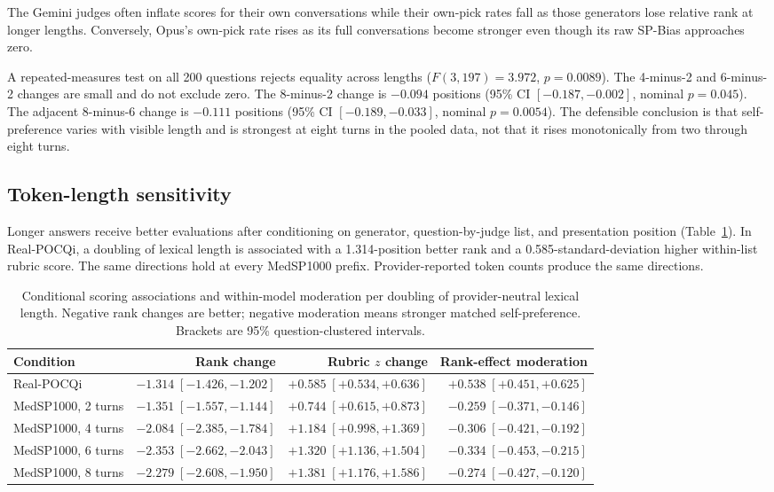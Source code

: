 \documentclass[11pt]{article}
\begin{document}
The Gemini judges often inflate scores for their own conversations while their
own-pick rates fall as those generators lose relative rank at longer lengths.
Conversely, Opus's own-pick rate rises as its full conversations become
stronger even though its raw SP-Bias approaches zero.

A repeated-measures test on all 200 questions
rejects equality across lengths ($F(3,197)=3.972$, $p=0.0089$). The 4-minus-2
and 6-minus-2 changes are small and do not exclude zero. The 8-minus-2 change is
$-0.094$ positions (95\% CI $[-0.187,-0.002]$, nominal $p=0.045$). The adjacent
8-minus-6 change is $-0.111$ positions (95\% CI $[-0.189,-0.033]$, nominal
$p=0.0054$). The
defensible conclusion is that self-preference varies with visible length and is
strongest at eight turns in the pooled data, not that it rises monotonically
from two through eight turns.

\subsection{Token-length sensitivity}

Longer answers receive better evaluations after conditioning on generator,
question-by-judge list, and presentation position (Table~\ref{tab:length}). In
Real-POCQi, a doubling of lexical length is associated with a 1.314-position
better rank and a 0.585-standard-deviation higher within-list rubric score. The
same directions hold at every MedSP1000 prefix. Provider-reported token counts
produce the same directions.

\begin{table}[htbp]
\centering
\scriptsize
\caption{Conditional scoring associations and within-model moderation per
doubling of provider-neutral lexical length. Negative rank changes are better;
negative moderation means stronger matched self-preference. Brackets are 95\%
question-clustered intervals.}
\label{tab:length}
\begin{tabular}{lrrr}
\toprule
Condition & Rank change & Rubric $z$ change & Rank-effect moderation \\
\midrule
Real-POCQi & $-1.314\;[-1.426,-1.202]$ & $+0.585\;[+0.534,+0.636]$ & $+0.538\;[+0.451,+0.625]$ \\
MedSP1000, 2 turns & $-1.351\;[-1.557,-1.144]$ & $+0.744\;[+0.615,+0.873]$ & $-0.259\;[-0.371,-0.146]$ \\
MedSP1000, 4 turns & $-2.084\;[-2.385,-1.784]$ & $+1.184\;[+0.998,+1.369]$ & $-0.306\;[-0.421,-0.192]$ \\
MedSP1000, 6 turns & $-2.353\;[-2.662,-2.043]$ & $+1.320\;[+1.136,+1.504]$ & $-0.334\;[-0.453,-0.215]$ \\
MedSP1000, 8 turns & $-2.279\;[-2.608,-1.950]$ & $+1.381\;[+1.176,+1.586]$ & $-0.274\;[-0.427,-0.120]$ \\
\bottomrule
\end{tabular}
\end{table}
\FloatBarrier
\end{document}
